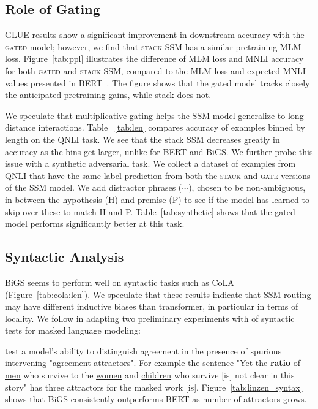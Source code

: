 \subsection{Role of Gating}

GLUE results show a significant improvement in downstream accuracy with the \textsc{gated} model; however, we find that \textsc{stack} SSM has a similar pretraining MLM loss.  Figure~\ref{tab:ppl} illustrates the difference of MLM loss and MNLI accuracy for both \textsc{gated} and \textsc{stack} SSM, compared to the MLM loss and expected MNLI values presented in BERT~\cite{devlin2018bert}. The figure shows that the gated model tracks closely the anticipated pretraining gains, while stack does not. 

We speculate that multiplicative gating helps the SSM model generalize to long-distance interactions. Table ~\ref{tab:len} compares accuracy of examples binned by length on the QNLI task. We see that the stack SSM decreases greatly in accuracy as the bins get larger, unlike for BERT and BiGS.  We further probe this issue with a synthetic adversarial task. We collect a dataset of examples from QNLI that have the same label prediction from both the \textsc{stack} and \textsc{gate} versions of the SSM model. We add distractor phrases ($\sim$), chosen to be non-ambiguous, in between the hypothesis (H) and premise (P) to see if the model has learned to skip over these to match H and P. Table~\ref{tab:synthetic} shows that the gated model performs significantly better at this task.

\subsection{Syntactic Analysis}

BiGS seems to perform well on syntactic tasks such as CoLA~\cite{warstadt2019neural} (Figure~\ref{tab:cola:len}). We speculate that these results indicate that SSM-routing may have different inductive biases than transformer, in particular in terms of locality. We follow \citet{goldberg2019assessing} in adapting two preliminary experiments with of syntactic tests for masked language modeling:

\citet{linzen2016assessing} test a model's ability to distinguish agreement in the presence of spurious intervening "agreement attractors". For example the sentence "Yet the \textbf{ratio} of \underline{men} who survive to the \underline{women} and \underline{children} who survive [is] not clear in this story" has three attractors for the masked work [is].  Figure~\ref{tab:linzen_syntax} shows that BiGS consistently outperforms BERT as number of attractors grows. 


